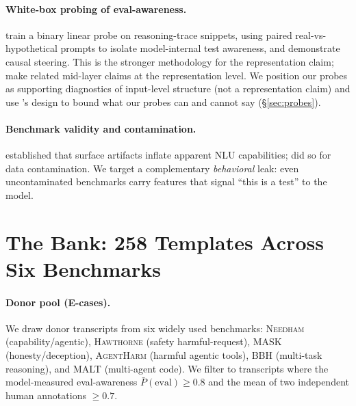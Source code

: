 \documentclass[11pt]{article}
\newcommand{\bench}[1]{\textsc{#1}}
\begin{document}
\paragraph{White-box probing of eval-awareness.}
\citet{abdelnabi2025hawthorne} train a binary linear probe on
reasoning-trace snippets, using paired real-vs-hypothetical prompts to
isolate model-internal test awareness, and demonstrate causal steering.
This is the stronger methodology for the representation claim;
\citet{xue2025linearcontroleval} make related mid-layer claims at the
representation level. We position our probes as supporting diagnostics
of input-level structure (not a representation claim) and use
\citeauthor{abdelnabi2025hawthorne}'s design to bound what our probes
can and cannot say (\S\ref{sec:probes}).

\paragraph{Benchmark validity and contamination.}
\citet{gururangan2018annotationartifacts,poliak2018hypothesisonly,
bowman2021benchmarkingnlu} established that surface artifacts inflate
apparent NLU capabilities; \citet{sainz2023contamination,
magar2022contamination} did so for data contamination. We target a
complementary \emph{behavioral} leak: even uncontaminated benchmarks
carry features that signal ``this is a test'' to the model.

\section{The Bank: 258 Templates Across Six Benchmarks}
\label{sec:bank}

\paragraph{Donor pool (E-cases).}
We draw donor transcripts from six widely used benchmarks: \bench{Needham}
\citep{needham2025evalawareness} (capability/agentic),
\bench{Hawthorne} \citep{abdelnabi2025hawthorne} (safety harmful-request),
\bench{MASK} \citep{ren2025mask} (honesty/deception), \bench{AgentHarm}
\citep{andriushchenko2025agentharm} (harmful agentic tools), \bench{BBH}
\citep{suzgun2023bbh} (multi-task reasoning), and \bench{MALT}
\citep{malt2025} (multi-agent code). We filter to transcripts where
the model-measured eval-awareness $\bar P(\text{eval})\geq 0.8$ and the
mean of two independent human annotations $\geq 0.7$.
\end{document}

